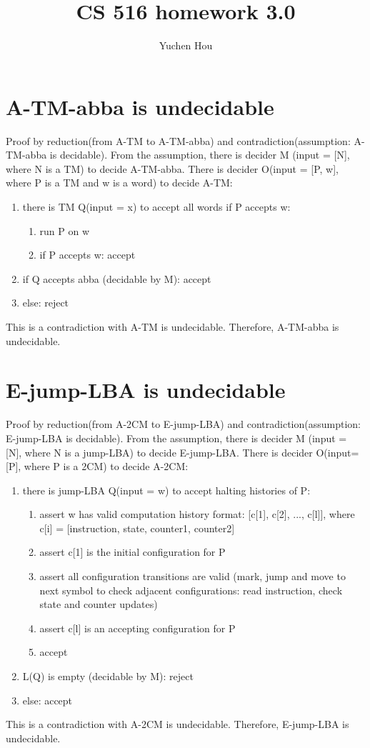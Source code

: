 \documentclass{article}
\begin{document}
\lstset{language=python, tabsize=4}
\title{CS 516 homework 3.0}
\author{Yuchen Hou}
\maketitle

\section{A-TM-abba is undecidable}
Proof by reduction(from A-TM to A-TM-abba) and contradiction(assumption: 
A-TM-abba is decidable).
From the assumption, there is decider M (input = [N], where N is a TM) to 
decide A-TM-abba.
There is decider O(input = [P, w], where P is a TM and w is a word) to decide 
A-TM:
\begin{enumerate}
	\item there is TM Q(input = x) to accept all words if P accepts w:
	\begin{enumerate}
		\item run P on w
		\item if P accepts w: accept
	\end{enumerate}
	\item if Q accepts abba (decidable by M): accept
	\item else: reject
\end{enumerate}
This is a contradiction with A-TM is undecidable. Therefore, A-TM-abba is undecidable.

\section{E-jump-LBA is undecidable}
Proof by reduction(from A-2CM to E-jump-LBA) and contradiction(assumption: 
E-jump-LBA is decidable).
From the assumption, there is decider M (input = [N], where N is a jump-LBA) to 
decide E-jump-LBA.
There is decider O(input=[P], where P is a 2CM) to decide A-2CM:
\begin{enumerate}
	\item there is jump-LBA Q(input = w) to accept halting histories of P:
	\begin{enumerate}
		\item assert w has valid computation history format: [c[1], c[2], ..., c[l]], where c[i] = [instruction, state, counter1, counter2]
		\item assert c[1] is the initial configuration for P
		\item assert all configuration transitions are valid (mark, jump and move to next symbol to check adjacent configurations: read instruction, check state and counter updates)
		\item assert c[l] is an accepting configuration for P
		\item accept
	\end{enumerate}
	\item L(Q) is empty (decidable by M): reject
	\item else: accept
\end{enumerate}
This is a contradiction with A-2CM is undecidable. Therefore, E-jump-LBA is undecidable.
\end{document}
